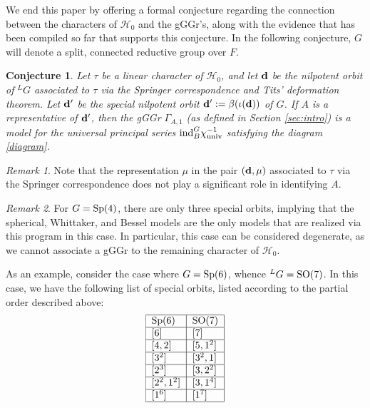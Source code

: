 \documentclass[11pt,letterpaper]{article}
\newcommand{\calH}{\mathcal{H}} %
\newcommand{\SO}{\textup{SO}}
\newcommand{\Sp}{\textup{Sp}}
\newcommand{\ind}{\textup{ind}}
\newtheorem{Conjecture}[Theorem]{Conjecture}
\theoremstyle{remark}
\newtheorem*{remark}{Remark}
\numberwithin{equation}{section}
\begin{document}
We end this paper by offering a formal conjecture regarding the connection between the characters of $\calH_0$ and the gGGr's, along with the evidence that has been compiled so far that supports this conjecture. In the following conjecture, $G$ will denote a split, connected reductive group over $F$.

\begin{Conjecture}\label{conj:springer}
Let $\tau$ be a linear character of $\calH_0$, and let ${\bf d}$ be the nilpotent orbit of $^LG$ associated to $\tau$ via the Springer correspondence and Tits' deformation theorem. Let ${\bf d}'$ be the special nilpotent orbit ${\bf d}' := \beta(\iota({\bf d}))$ of $G$. If $A$ is a representative of ${\bf d}'$, then the gGGr $\Gamma_{A,1}$ (as defined in Section \ref{sec:intro}) is a model for the universal principal series $\ind_B^G\chi_{\textup{univ}}^{-1}$ satisfying the diagram \eqref{diagram}.
\end{Conjecture}

\begin{remark}
Note that the representation $\mu$ in the pair $({\bf d}, \mu)$ associated to $\tau$ via the Springer correspondence does not play a significant role in identifying $A$.
\end{remark}

\begin{remark}
For $G = \Sp(4)$, there are only three special orbits, implying that the spherical, Whittaker, and Bessel models are the only models that are realized via this program in this case. In particular, this case can be considered degenerate, as we cannot associate a gGGr to the remaining character of $\calH_0$.
\end{remark}

As an example, consider the case where $G = \Sp(6)$, whence $^LG = \SO(7)$. In this case, we have the following list of special orbits, listed according to the partial order described above:
\begin{equation}\label{table:orbits}
\begin{tabular}{|l|l|}
\hline
$\Sp(6)$ & $\SO(7)$ \\
\hline
$[6]$ & $[7]$ \\
\hline
$[4,2]$ & $[5,1^2]$ \\
\hline
$[3^2]$ & $[3^2,1]$ \\
\hline
$[2^3]$ & $[3,2^2]$ \\
\hline
$[2^2,1^2]$ & $[3,1^4]$ \\
\hline
$[1^6]$ & $[1^7]$ \\
\hline
\end{tabular}
\end{equation}
\end{document}
